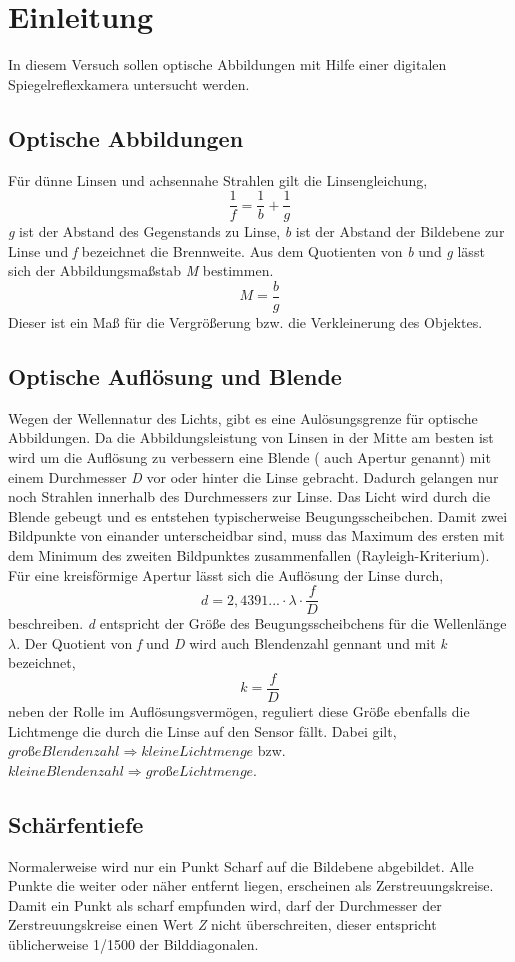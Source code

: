\section{Einleitung}
In diesem Versuch sollen optische Abbildungen mit Hilfe einer digitalen Spiegelreflexkamera untersucht werden.
\subsection{Optische Abbildungen}
Für dünne Linsen und achsennahe Strahlen gilt die Linsengleichung,
\begin{equation}
\frac{1}{f}=\frac{1}{b}+\frac{1}{g}
\end{equation}
\textit{g} ist der Abstand des Gegenstands zu Linse, \textit{b} ist der Abstand der Bildebene zur Linse und \textit{f} bezeichnet die Brennweite.
Aus dem Quotienten von \textit{b} und \textit{g} lässt sich der Abbildungsmaßstab \textit{M} bestimmen.
\begin{equation}
M=\frac{b}{g}
\end{equation}
Dieser ist ein Maß für die Vergrößerung bzw. die Verkleinerung des Objektes.
\subsection{Optische Auflösung und Blende}
Wegen der Wellennatur des Lichts, gibt es eine Aulösungsgrenze für optische Abbildungen. Da die Abbildungsleistung von Linsen in der Mitte am besten ist wird um die Auflösung zu verbessern eine Blende ( auch Apertur genannt) mit einem Durchmesser \textit{D} vor oder hinter die Linse gebracht. Dadurch gelangen nur noch Strahlen innerhalb des Durchmessers zur Linse. Das Licht wird durch die Blende gebeugt und es entstehen typischerweise Beugungsscheibchen. Damit zwei Bildpunkte von einander unterscheidbar sind, muss das Maximum des ersten mit dem Minimum des zweiten Bildpunktes zusammenfallen (Rayleigh-Kriterium).
Für eine kreisförmige Apertur lässt sich die Auflösung der Linse durch,
\begin{equation}
d=2,4391...\cdot\lambda\cdot\frac{f}{D}
\end{equation}
beschreiben. \textit{d} entspricht der Größe des Beugungsscheibchens für die Wellenlänge $ \lambda $.
Der Quotient von \textit{f} und \textit{D} wird auch Blendenzahl gennant und mit \textit{k} bezeichnet,
\begin{equation}
k=\frac{f}{D}
\end{equation}
neben der Rolle im Auflösungsvermögen, reguliert diese Größe ebenfalls die Lichtmenge die durch die Linse auf den Sensor fällt.
Dabei gilt,$ große Blendenzahl \Rightarrow kleine Lichtmenge $ bzw.
$ kleine Blendenzahl \Rightarrow große Lichtmenge $.
\subsection{Schärfentiefe}
Normalerweise wird nur ein Punkt Scharf auf die Bildebene abgebildet. Alle Punkte die weiter oder näher entfernt liegen, erscheinen als Zerstreuungskreise. Damit ein Punkt als scharf empfunden wird, darf der Durchmesser der Zerstreuungskreise einen Wert \textit{Z} nicht überschreiten, dieser entspricht üblicherweise 1/1500 der Bilddiagonalen.

